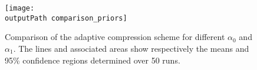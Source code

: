 \documentclass[letterpaper,11pt]{extarticle}
\newcommand{\outputPath}{output/}
\begin{document}
\begin{figure}[ht]
    \centering
    \texttt{[image: \\outputPath comparison\_priors]}
    \caption{Comparison of the adaptive compression scheme for different $\alpha_0$ and $\alpha_1$. The lines and associated areas show respectively the means and 95\% confidence regions determined over 50 runs.}
    \label{fig:comparison_priors}
\end{figure}

\endgroup
\printbibliography
\end{document}
